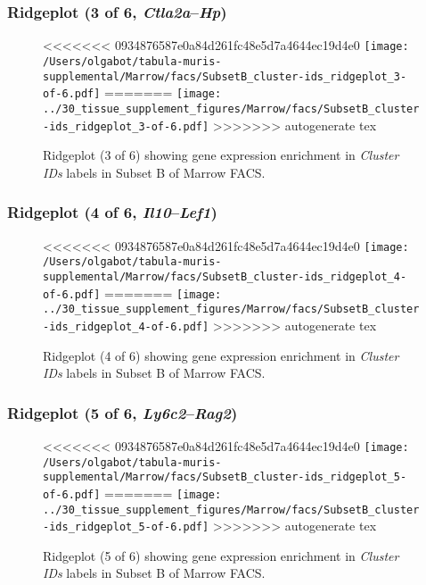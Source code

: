 \clearpage

\subsubsection{Ridgeplot (3 of 6, \emph{Ctla2a}--\emph{Hp})}
\begin{figure}[h]
\centering
<<<<<<< 0934876587e0a84d261fc48e5d7a4644ec19d4e0
\texttt{[image: /Users/olgabot/tabula-muris-supplemental/Marrow/facs/SubsetB\_cluster-ids\_ridgeplot\_3-of-6.pdf]}
=======
\texttt{[image: ../30\_tissue\_supplement\_figures/Marrow/facs/SubsetB\_cluster-ids\_ridgeplot\_3-of-6.pdf]}
>>>>>>> autogenerate tex

\caption{ Ridgeplot (3 of 6)  showing gene expression enrichment in \emph{Cluster IDs} labels in Subset B of Marrow FACS. }
\end{figure}


\clearpage

\subsubsection{Ridgeplot (4 of 6, \emph{Il10}--\emph{Lef1})}
\begin{figure}[h]
\centering
<<<<<<< 0934876587e0a84d261fc48e5d7a4644ec19d4e0
\texttt{[image: /Users/olgabot/tabula-muris-supplemental/Marrow/facs/SubsetB\_cluster-ids\_ridgeplot\_4-of-6.pdf]}
=======
\texttt{[image: ../30\_tissue\_supplement\_figures/Marrow/facs/SubsetB\_cluster-ids\_ridgeplot\_4-of-6.pdf]}
>>>>>>> autogenerate tex

\caption{ Ridgeplot (4 of 6)  showing gene expression enrichment in \emph{Cluster IDs} labels in Subset B of Marrow FACS. }
\end{figure}


\clearpage

\subsubsection{Ridgeplot (5 of 6, \emph{Ly6c2}--\emph{Rag2})}
\begin{figure}[h]
\centering
<<<<<<< 0934876587e0a84d261fc48e5d7a4644ec19d4e0
\texttt{[image: /Users/olgabot/tabula-muris-supplemental/Marrow/facs/SubsetB\_cluster-ids\_ridgeplot\_5-of-6.pdf]}
=======
\texttt{[image: ../30\_tissue\_supplement\_figures/Marrow/facs/SubsetB\_cluster-ids\_ridgeplot\_5-of-6.pdf]}
>>>>>>> autogenerate tex

\caption{ Ridgeplot (5 of 6)  showing gene expression enrichment in \emph{Cluster IDs} labels in Subset B of Marrow FACS. }
\end{figure}


